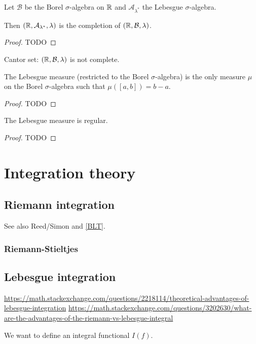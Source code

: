 \begin{proposition}
Let $\mathcal{B}$ be the Borel $\sigma$-algebra on $\mathbb{R}$ and $\mathcal{A}_{\lambda^*}$ the Lebesgue $\sigma$-algebra.

Then $\left( \mathbb{R}, \mathcal{A}_{\lambda^*}, \lambda \right)$ is the completion of $\left( \mathbb{R}, \mathcal{B}, \lambda \right)$.
\end{proposition}
\begin{proof}
TODO
\end{proof}

\begin{example}
Cantor set: $\left( \mathbb{R}, \mathcal{B}, \lambda \right)$ is not complete.
\end{example}

\begin{proposition}
The Lebesgue measure (restricted to the Borel $\sigma$-algebra) is the only measure $\mu$ on the Borel $\sigma$-algebra such that $\mu([a,b]) = b-a$.
\end{proposition}
\begin{proof}
TODO
\end{proof}

\begin{proposition}
The Lebesgue measure is regular.
\end{proposition}
\begin{proof}
TODO
\end{proof}

\chapter{Integration theory}
\section{Riemann integration}
See also Reed/Simon and \ref{BLT}.
\subsection{Riemann-Stieltjes}

\section{Lebesgue integration}
\url{https://math.stackexchange.com/questions/2218114/theoretical-advantages-of-lebesgue-integration}
\url{https://math.stackexchange.com/questions/3202630/what-are-the-advantages-of-the-riemann-vs-lebesgue-integral}

We want to define an integral functional $I(f)$.

